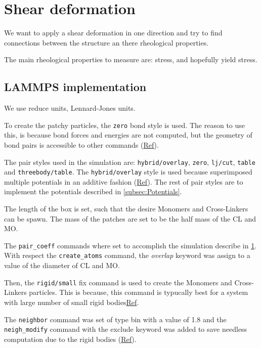 \documentclass[main.tex]{subfiles}
\begin{document}
\section{Shear deformation}\label{sec:descriptionSimulation}

We want to apply a shear deformation in one direction and try to find connections between the structure an there rheological properties.

The main rheological properties to measure are: stress, and hopefully yield stress.

\subsection{LAMMPS implementation}

We use reduce units, Lennard-Jones units.

To create the patchy particles, the \verb|zero| bond style is used.
The reason to use this, is because bond forces and energies are not computed, but the geometry of bond pairs is accessible to other commands (\href{https://docs.lammps.org/bond_zero.html}{Ref}).

The pair styles used in the simulation are: \verb|hybrid/overlay|, \verb|zero|, \verb|lj/cut|, \verb|table| and \verb|threebody/table|.
The \verb|hybrid/overlay| style is used because superimposed multiple potentials in an additive fashion (\href{https://docs.lammps.org/pair_hybrid.html}{Ref}).
The rest of pair styles are to implement the potentials described in \ref{subsec:Potentials}.

The length of the box is set, such that the desire Monomers and Cross-Linkers can be spawn.
The mass of the patches are set to be the half mass of the CL and MO.

The \verb|pair_coeff| commands where set to accomplish the simulation describe in \ref{sec:descriptionSimulation}.
With respect the \verb|create_atoms| command, the \textit{overlap} keyword was assign to a value of the diameter of CL and MO.

Then, the \verb|rigid/small| fix command is used to create the Monomers and Cross-Linkers particles.
This is because, this command is typucally best for a system with large number of small rigid bodies\href{https://docs.lammps.org/fix_rigid.html}{Ref}.

The \verb|neighbor| command was set of type bin with a value of 1.8 and the \verb|neigh_modify| command with the exclude keyword was added to save needless computation due to the rigid bodies (\href{https://docs.lammps.org/neigh_modify.html}{Ref}).
\end{document}

